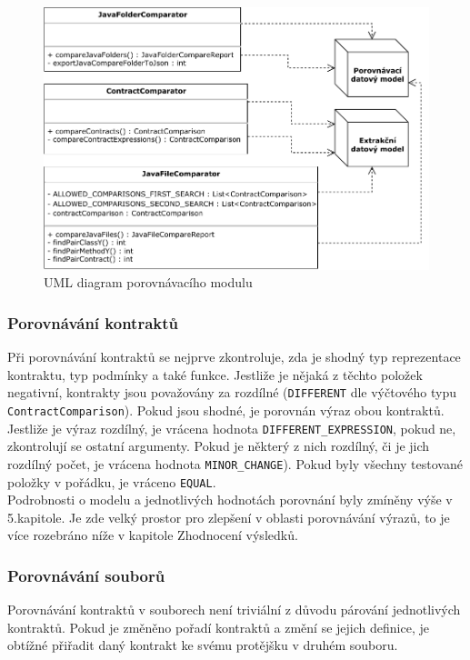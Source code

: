 	    	\begin{figure}[!htb]
					\centering
					\includegraphics[width=1\textwidth]{img/comparatorUMLdiagram.pdf}
					\caption[comparatorUMLdiagram]{UML diagram porovnávacího modulu}
					\label{comparatorUMLdiagram}
				\endminipage\hfill
			\end{figure}
	    
	    
	    
	    \subsubsection{Porovnávání kontraktů}
	    	Při porovnávání kontraktů se nejprve zkontroluje, zda je shodný typ reprezentace kontraktu, typ podmínky a také funkce. Jestliže je nějaká z těchto položek negativní, kontrakty jsou považovány za rozdílné (\texttt{DIFFERENT} dle výčtového typu \texttt{ContractComparison}). Pokud jsou shodné, je porovnán výraz obou kontraktů. Jestliže je výraz rozdílný, je vrácena hodnota \texttt{DIFFERENT\_EXPRESSION}, pokud ne, zkontrolují se ostatní argumenty. Pokud je některý z nich rozdílný, či je jich rozdílný počet, je vrácena hodnota \texttt{MINOR\_CHANGE}). Pokud byly všechny testované položky v pořádku, je vráceno \texttt{EQUAL}.\\
	    	
	    	Podrobnosti o modelu a jednotlivých hodnotách porovnání byly zmíněny výše v 5.kapitole. Je zde velký prostor pro zlepšení v oblasti porovnávání výrazů, to je více rozebráno níže v kapitole Zhodnocení výsledků.
	    
	    \subsubsection{Porovnávání souborů}
	    	Porovnávání kontraktů v souborech není triviální z důvodu párování jednotlivých kontraktů. Pokud je změněno pořadí kontraktů a změní se jejich definice, je obtížné přiřadit daný kontrakt ke svému protějšku v druhém souboru.\\
	    	
